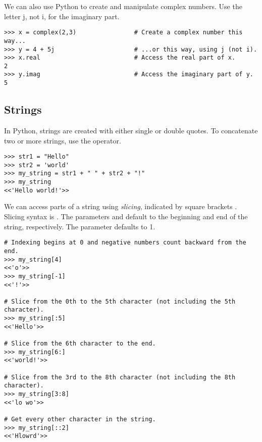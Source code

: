 We can also use Python to create and manipulate complex numbers.
Use the letter j, not i, for the imaginary part.
\begin{lstlisting}
>>> x = complex(2,3)                # Create a complex number this way...
>>> y = 4 + 5j	                    # ...or this way, using j (not i).
>>> x.real                          # Access the real part of x.
2
>>> y.imag                          # Access the imaginary part of y.
5
\end{lstlisting}


\subsection*{Strings}
In Python, strings are created with either single or double quotes.
To concatenate two or more strings, use the \li{+} operator.
\begin{lstlisting}
>>> str1 = "Hello"
>>> str2 = 'world'
>>> my_string = str1 + " " + str2 + "!"
>>> my_string
<<'Hello world!'>>
\end{lstlisting}

We can access parts of a string using \emph{slicing}, indicated by square brackets \li{[ ]}.
Slicing syntax is .
The parameters  and  default to the beginning and end of the string, respectively.
The parameter  defaults to 1.

\begin{lstlisting}
# Indexing begins at 0 and negative numbers count backward from the end.
>>> my_string[4]
<<'o'>>
>>> my_string[-1]
<<'!'>>

# Slice from the 0th to the 5th character (not including the 5th character).
>>> my_string[:5]
<<'Hello'>>

# Slice from the 6th character to the end.
>>> my_string[6:]
<<'world!'>>

# Slice from the 3rd to the 8th character (not including the 8th character).
>>> my_string[3:8]
<<'lo wo'>>

# Get every other character in the string.
>>> my_string[::2]
<<'Hlowrd'>>
\end{lstlisting}

